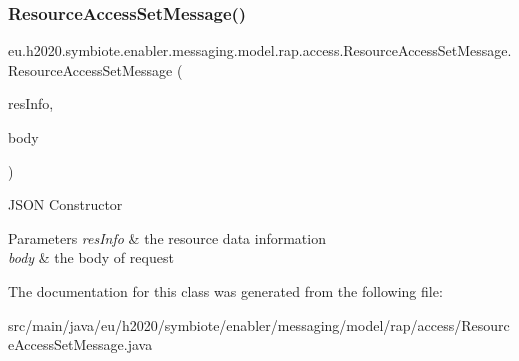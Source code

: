 \subsubsection{\texorpdfstring{Resource\+Access\+Set\+Message()}{ResourceAccessSetMessage()}}
{\footnotesize\ttfamily eu.\+h2020.\+symbiote.\+enabler.\+messaging.\+model.\+rap.\+access.\+Resource\+Access\+Set\+Message.\+Resource\+Access\+Set\+Message (\begin{DoxyParamCaption}\item[{@Json\+Property(\char`\"{}resource\+Info\char`\"{}) List$<$ \hyperlink{classeu_1_1h2020_1_1symbiote_1_1enabler_1_1messaging_1_1model_1_1rap_1_1db_1_1ResourceInfo}{Resource\+Info} $>$}]{res\+Info,  }\item[{@Json\+Property(\char`\"{}body\char`\"{}) String}]{body }\end{DoxyParamCaption})}

J\+S\+ON Constructor 
\begin{DoxyParams}{Parameters}
{\em res\+Info} & the resource data information \\
\hline
{\em body} & the body of request \\
\hline
\end{DoxyParams}


The documentation for this class was generated from the following file\+:\begin{DoxyCompactItemize}
\item 
src/main/java/eu/h2020/symbiote/enabler/messaging/model/rap/access/Resource\+Access\+Set\+Message.\+java\end{DoxyCompactItemize}
